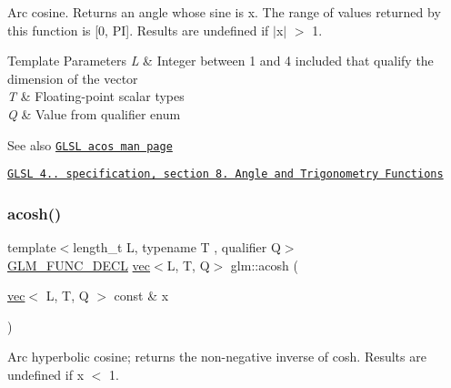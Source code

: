 Arc cosine. Returns an angle whose sine is x. The range of values returned by this function is \mbox{[}0, PI\mbox{]}. Results are undefined if $\vert$x$\vert$ $>$ 1.


\begin{DoxyTemplParams}{Template Parameters}
{\em L} & Integer between 1 and 4 included that qualify the dimension of the vector \\
\hline
{\em T} & Floating-\/point scalar types \\
\hline
{\em Q} & Value from qualifier enum\\
\hline
\end{DoxyTemplParams}
\begin{DoxySeeAlso}{See also}
\href{http://www.opengl.org/sdk/docs/manglsl/xhtml/acos.xml}{\tt G\+L\+SL acos man page} 

\href{http://www.opengl.org/registry/doc/GLSLangSpec.4.20.8.pdf}{\tt G\+L\+SL 4.. specification, section 8. Angle and Trigonometry Functions} 
\end{DoxySeeAlso}
\mbox{\label{group__core__func__trigonometric_ga858f35dc66fd2688f20c52b5f25be76a}} 
\subsubsection{\texorpdfstring{acosh()}{acosh()}}
{\footnotesize\ttfamily template$<$length\+\_\+t L, typename T , qualifier Q$>$ \\
\mbox{\hyperlink{setup_8hpp_ab2d052de21a70539923e9bcbf6e83a51}{G\+L\+M\+\_\+\+F\+U\+N\+C\+\_\+\+D\+E\+CL}} \mbox{\hyperlink{structglm_1_1vec}{vec}}$<$L, T, Q$>$ glm\+::acosh (\begin{DoxyParamCaption}\item[{\mbox{\hyperlink{structglm_1_1vec}{vec}}$<$ L, T, Q $>$ const \&}]{x }\end{DoxyParamCaption})}

Arc hyperbolic cosine; returns the non-\/negative inverse of cosh. Results are undefined if x $<$ 1.


